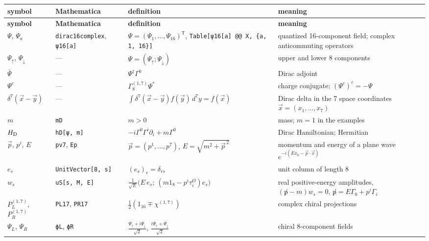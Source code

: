 \documentclass[10pt,a4paper]{article}
\begin{document}
{\footnotesize
\begin{longtable}{>{\raggedright\arraybackslash}p{}>{\raggedright\arraybackslash}p{}>{\raggedright\arraybackslash}p{}>{\raggedright\arraybackslash}p{}}
\toprule
\textbf{symbol} & \textbf{Mathematica} & \textbf{definition} & \textbf{meaning} \\
\midrule\endfirsthead
\toprule
\textbf{symbol} & \textbf{Mathematica} & \textbf{definition} & \textbf{meaning} \\
\midrule\endhead
\endfoot
\bottomrule\endlastfoot
$\Psi$, $\Psi_a$ & \texttt{dirac16complex}, \texttt{ψ16[a]} & $\Psi=(\Psi_1,\dots,\Psi_{16})^{\mathsf T}$, \texttt{Table[ψ16[a] @@ X, \{a, 1, 16\}]} & quantized 16-component field; complex anticommuting operators \\
$\Psi_\uparrow$, $\Psi_\downarrow$ & — & $\Psi=(\Psi_\uparrow;\Psi_\downarrow)$ & upper and lower 8 components \\
$\bar\Psi$ & — & $\Psi^\dagger\Gamma^{0}$ & Dirac adjoint \\
$\Psi^c$ & — & $\Gamma^{(1,7)}_8\Psi^*$ & charge conjugate; $(\Psi^c)^c=-\Psi$ \\
$\delta^7(\vec x-\vec y)$ & — & $\int\delta^7(\vec x-\vec y)f(\vec y)\,d^7y=f(\vec x)$ & Dirac delta in the 7 space coordinates $\vec x=(x_1,\dots,x_7)$ \\
$m$ & \texttt{mD} & $m>0$ & mass; $m=1$ in the examples \\
$H_{\rm D}$ & \texttt{hD[ψ, m]} & $-i\Gamma^{0}\Gamma^{i}\partial_i+m\Gamma^{0}$ & Dirac Hamiltonian; Hermitian \\
$\vec p$, $p^i$, $E$ & \texttt{pv7}, \texttt{Ep} & $\vec p=(p^1,\dots,p^7)$, $E=\sqrt{m^2+\vec p^{\,2}}$ & momentum and energy of a plane wave $e^{-i(Ex_0-\vec p\cdot\vec x)}$ \\
$e_s$ & \texttt{UnitVector[8, s]} & $(e_s)_r=\delta_{rs}$ & unit column of length 8 \\
$w_s$ & \texttt{uS[s, M, E]} & $\frac1{\sqrt E}\big(E\,e_s;\ (m1_8-p^i\tau^{O}_i)e_s\big)$ & real positive-energy amplitudes, $(\not p-m)w_s=0$, $\not p=E\Gamma_0+p^i\Gamma_i$ \\
$P^{(1,7)}_L$, $P^{(1,7)}_R$ & \texttt{PL17}, \texttt{PR17} & $\frac12(1_{16}\mp\chi^{(1,7)})$ & complex chiral projections \\
$\Psi_L$, $\Psi_R$ & \texttt{ϕL}, \texttt{ϕR} & $\frac{\Psi_\uparrow+i\Psi_\downarrow}{\sqrt2}$, $\frac{i\Psi_\uparrow+\Psi_\downarrow}{\sqrt2}$ & chiral 8-component fields \\

\end{longtable}}
\end{document}
